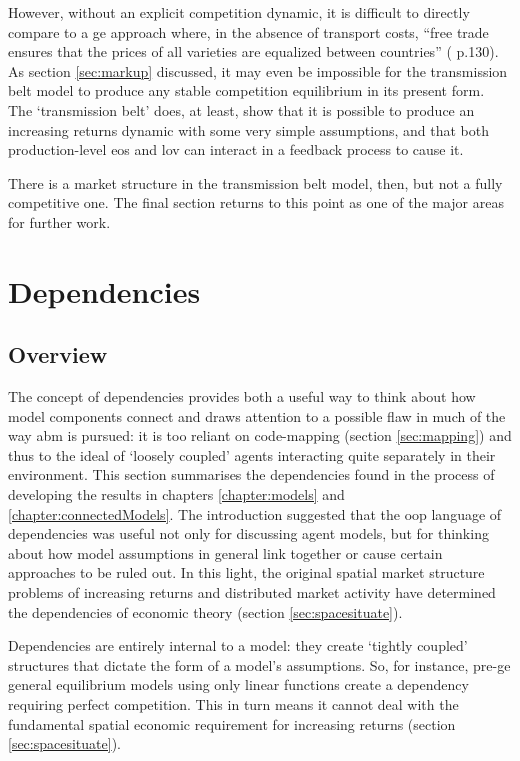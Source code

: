 However, without an explicit competition dynamic, it is difficult to directly compare to a \gls{ge} approach where, in the absence of transport costs, ``free trade ensures that the prices of all varieties are equalized between countries'' (\citealt{brakman_new_2009} p.130). As section \ref{sec:markup} discussed, it may even be impossible for the transmission belt model to produce any stable competition equilibrium in its present form. The `transmission belt' does, at least, show that it is possible to produce an increasing returns dynamic with some very simple assumptions, and that both production-level \gls{eos} and \gls{lov} can interact in a feedback process to cause it. 

There is a market structure in the transmission belt model, then, but not a fully competitive one. The final section returns to this point as one of the major areas for further work.

\section{Dependencies \label{sec:deps}}

\subsection{Overview}

The concept of dependencies provides both a useful way to think about how model components connect and draws attention to a possible flaw in much of the way \gls{abm} is pursued: it is too reliant on code-mapping (section \ref{sec:mapping}) and thus to the ideal of `loosely coupled' agents interacting quite separately in their environment. This section summarises the dependencies found in the process of developing the results in chapters \ref{chapter:models} and \ref{chapter:connectedModels}. The introduction suggested that the \gls{oop} language of dependencies was useful not only for discussing agent models, but for thinking about how model assumptions in general link together or cause certain approaches to be ruled out. In this light, the original spatial market structure problems of increasing returns and distributed market activity have determined the dependencies of economic theory (section \ref {sec:spacesituate}).

Dependencies are entirely internal to a model: they create `tightly coupled' structures that dictate the form of a model's assumptions. So, for instance, pre-\gls{ge} general equilibrium models using only linear functions create a dependency requiring perfect competition. This in turn means it cannot deal with the fundamental spatial economic requirement for increasing returns (section \ref{sec:spacesituate}).

